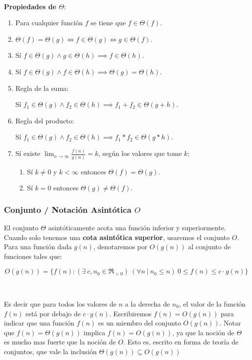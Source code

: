~

\textbf{Propiedades de $\Theta$}:
\begin{enumerate}
 \item Para cualquier funci\'on $f$ se tiene que $f \in \Theta(f)$.
 \item $\Theta(f) = \Theta(g) \iff f \in \Theta(g) \iff g \in \Theta(f)$.
 \item S\'i $f \in \Theta(g) \land g \in \Theta(h) \implies f \in \Theta(h)$.
 \item S\'i $f \in \Theta(g) \land f \in \Theta(h) \implies \Theta(g) = \Theta(h)$.
 \item Regla de la suma:

	S\'i $f_1 \in \Theta(g) \land f_2 \in \Theta(h) \implies f_1 + f_2 \in \Theta(g+h)$.
 \item Regla del producto:

	S\'i $f_1 \in \Theta(g) \land f_2 \in \Theta(h) \implies f_1 * f_2 \in \Theta(g*h)$.
 \item S\'i existe $\lim_{n \to \infty} \frac{f(n)}{g(n)} = k$, seg\'un los valores que tome $k$:
	\begin{enumerate}
	  \item S\'i $k \neq 0$ y $k < \infty$ entonces $\Theta(f) = \Theta(g)$.
	  \item S\'i $k = 0$ entonces $\Theta(g) \neq \Theta(f)$.
	\end{enumerate}
\end{enumerate}

\subsubsection{Conjunto / Notaci\'on Asint\'otica $O$}

El conjunto $\Theta$ asint\'oticamente acota una funci\'on inferior y superiormente. Cuando solo tenemos una \textbf{cota asint\'otica superior}, usaremos el conjunto $O$. Para una funci\'on dada $g(n)$, denotaremos por $O(g(n))$ al conjunto de funciones tales que:

\begin{equation*}
 O(g(n)) = \{ f(n) : (\exists\ c, n_0 \in \Re_{>0}) \ (\forall n\ |\ n_0 \leq n)\ 0 \leq f(n) \leq c \cdot g(n) \}
\end{equation*}

~

Es decir que para todos los valores de $n$ a la derecha de $n_0$, el valor de la funci\'on $f(n)$ est\'a por debajo de $c \cdot g(n)$. Escribiremos $f(n) = O(g(n))$ para indicar que una funci\'on $f(n)$ es un miembro del conjunto $O(g(n))$. Notar que $f(n) = \Theta(g(n))$ implica $f(n) = O(g(n))$, ya que la noci\'on de $\Theta$ es mucho mas fuerte que la noci\'on de $O$. Esto es, escrito en forma de teor\'ia de conjuntos, que vale la inclusi\'on $\Theta(g(n)) \subseteq O(g(n))$

